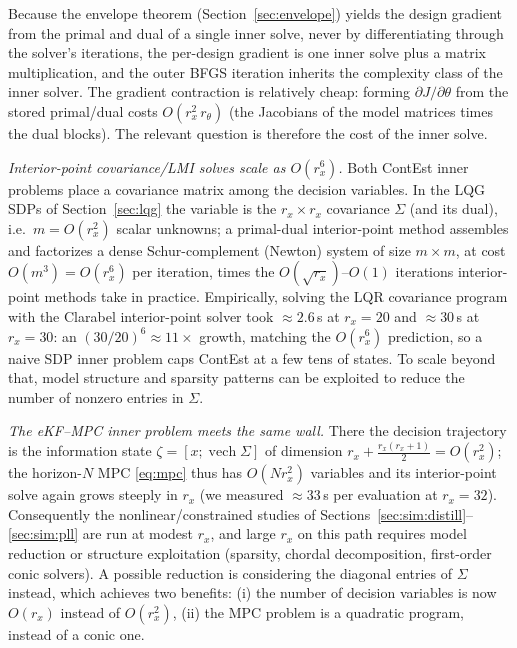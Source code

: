 \documentclass[twocolumn,amsthm]{autart}
\begin{document}
Because the envelope theorem (Section~\ref{sec:envelope}) yields the design
gradient from the primal and dual of a single inner solve, never by
differentiating through the solver's iterations, the per-design gradient is one inner
solve plus a matrix multiplication, and the outer BFGS iteration inherits the
complexity class of the inner solver. The gradient contraction is relatively cheap: forming
$\partial J/\partial\theta$ from the stored primal/dual costs
$O(r_x^2\,r_\theta)$ (the Jacobians of the model
matrices times the dual blocks). The relevant question is therefore the cost of the inner solve.

\emph{Interior-point covariance/LMI solves scale as $O(r_x^6)$.} Both ContEst
inner problems place a covariance matrix among the decision variables. In the LQG
SDPs of Section~\ref{sec:lqg} the variable is the $r_x\times r_x$ covariance
$\Sigma$ (and its dual), i.e.\ $m=O(r_x^2)$ scalar unknowns; a primal-dual
interior-point method assembles and factorizes a dense Schur-complement (Newton)
system of size $m\times m$, at cost $O(m^3)=O(r_x^6)$ per iteration, times the
$O(\sqrt{r_x})$--$O(1)$ iterations interior-point methods take in practice. Empirically, solving the LQR
covariance program with the Clarabel interior-point solver took
$\approx\!2.6\,$s at $r_x=20$ and $\approx\!30\,$s at $r_x=30$: an
$(30/20)^6\!\approx\!11\times$ growth, matching the $O(r_x^6)$ prediction, so a
naive SDP inner problem caps ContEst at a few tens of states. To scale beyond that, model structure and sparsity patterns can be exploited to reduce the number of nonzero entries in $\Sigma$.

\emph{The eKF--MPC inner problem meets the same wall.} There the decision trajectory
is the information state $\zeta=[x;\operatorname{vech}\Sigma]$ of dimension
$r_x+\tfrac{r_x(r_x+1)}{2}=O(r_x^2)$; the horizon-$N$ MPC \eqref{eq:mpc} thus has
$O(N r_x^2)$ variables and its interior-point solve again grows steeply in $r_x$
(we measured $\approx\!33\,$s per evaluation at $r_x=32$).
Consequently the nonlinear/constrained studies of
Sections~\ref{sec:sim:distill}--\ref{sec:sim:pll} are run at modest $r_x$, and
large $r_x$ on this path requires model reduction or structure exploitation
(sparsity, chordal decomposition, first-order conic solvers). A possible reduction is considering the diagonal entries of $\Sigma$ instead, which achieves two benefits: (i) the number of decision variables is now $O(r_x)$ instead of $O(r_x^2)$, (ii) the MPC problem is a quadratic program, instead of a conic one.
\end{document}
